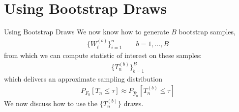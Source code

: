 \documentclass[aspectratio=169, handout]{beamer}
\begin{document}




\section{Using Bootstrap Draws}
\begin{frame}[shrink]{Using Bootstrap Draws}
We now know how to generate $B$ bootstrap samples,
\begin{align*}
  \big\{W_i^{(b)}\big\}_{i=1}^n
  \qquad
  b = 1,\ldots,B
\end{align*}
from which we can compute statistic of interest on these samples:
\begin{align*}
  \big\{T^{(b)}_n\big\}_{b=1}^B
\end{align*}
which delivers an approximate sampling distribution
\begin{align*}
  P_{F_0}[T_n\leq \tau]
  \approx
  P_{\hat{F}_n}[T_n^{(b)}\leq \tau]
\end{align*}
We now discuss how to use the $\{T_n^{(b)}\}$ draws.
\end{frame}
\end{document}
